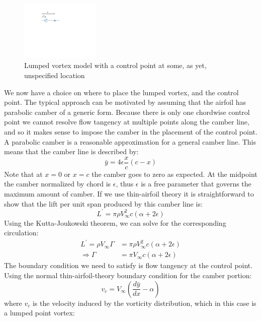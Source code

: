 \documentclass{article}
\begin{document}
\begin{figure}[htbp]
\centering
\includegraphics[width=1.5in]{figs/lumped-vortex}
\caption{Lumped vortex model with a control point at some, as yet, unspecified location}
\label{fig:lumped-vortex}
\end{figure}

We now have a choice on where to place the lumped vortex, and the control point.  The typical approach can be motivated by assuming that the airfoil has parabolic camber of a generic form.  Because there is only one chordwise control point we cannot resolve flow tangency at multiple points along the camber line, and so it makes sense to impose the camber in the placement of the control point.  A parabolic camber is a reasonable approximation for a general camber line.  This means that the camber line is described by:
\begin{equation}
\bar{y} = 4 \epsilon \frac{x}{c} (c - x)
\end{equation}
Note that at $x = 0$ or $x = c$ the camber goes to zero as expected.  At the midpoint the camber normalized by chord is $\epsilon$, thus $\epsilon$ is a free parameter that governs the maximum amount of camber.  If we use thin-airfoil theory it is straightforward to show that the lift per unit span produced by this camber line is:
\begin{equation}
L^\prime = \pi \rho V_\infty^2 c (\alpha + 2 \epsilon)
\end{equation}
Using the Kutta-Joukowski theorem, we can solve for the corresponding circulation:
\begin{align}
L^\prime = \rho V_\infty \Gamma &= \pi \rho V_\infty^2 c (\alpha + 2 \epsilon)\\
\Rightarrow \Gamma &= \pi V_\infty c (\alpha + 2 \epsilon)
\end{align}
The boundary condition we need to satisfy is flow tangency at the control point.  Using the normal thin-airfoil-theory boundary condition for the camber portion:
\begin{equation}
v_c = V_\infty \left(\frac{d\bar{y}}{dx} - \alpha \right)
\end{equation}
where $v_c$ is the velocity induced by the vorticity distribution, which in this case is a lumped point vortex:
\end{document}
